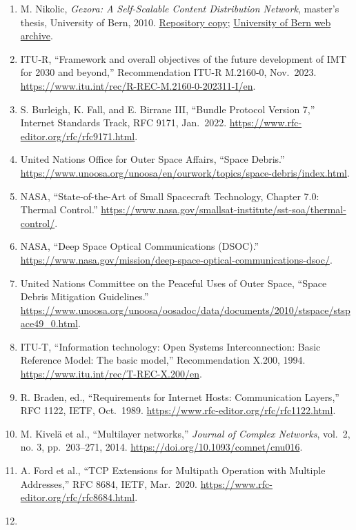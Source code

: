 \documentclass[
  american,
  11pt,
]{article}
\providecommand{\tightlist}{%
  \setlength{\itemsep}{0pt}\setlength{\parskip}{0pt}}
\begin{document}
\begin{enumerate}
\def\labelenumi{\arabic{enumi}.}
\tightlist
\item
  M. Nikolic, \emph{Gezora: A Self-Scalable Content Distribution
  Network}, master's thesis, University of Bern, 2010.
  \href{../Ni10.pdf}{Repository copy};
  \href{https://webarchive.inf.unibe.ch/cds/publications/files/Ni10.pdf}{University
  of Bern web archive}.
\item
  ITU-R, ``Framework and overall objectives of the future development of
  IMT for 2030 and beyond,'' Recommendation ITU-R M.2160-0, Nov.~2023.
  \url{https://www.itu.int/rec/R-REC-M.2160-0-202311-I/en}.
\item
  S. Burleigh, K. Fall, and E. Birrane III, ``Bundle Protocol Version
  7,'' Internet Standards Track, RFC 9171, Jan.~2022.
  \url{https://www.rfc-editor.org/rfc/rfc9171.html}.
\item
  United Nations Office for Outer Space Affairs, ``Space Debris.''
  \url{https://www.unoosa.org/unoosa/en/ourwork/topics/space-debris/index.html}.
\item
  NASA, ``State-of-the-Art of Small Spacecraft Technology, Chapter 7.0:
  Thermal Control.''
  \url{https://www.nasa.gov/smallsat-institute/sst-soa/thermal-control/}.
\item
  NASA, ``Deep Space Optical Communications (DSOC).''
  \url{https://www.nasa.gov/mission/deep-space-optical-communications-dsoc/}.
\item
  United Nations Committee on the Peaceful Uses of Outer Space, ``Space
  Debris Mitigation Guidelines.''
  \url{https://www.unoosa.org/unoosa/oosadoc/data/documents/2010/stspace/stspace49_0.html}.
\item
  ITU-T, ``Information technology: Open Systems Interconnection: Basic
  Reference Model: The basic model,'' Recommendation X.200, 1994.
  \url{https://www.itu.int/rec/T-REC-X.200/en}.
\item
  R. Braden, ed., ``Requirements for Internet Hosts: Communication
  Layers,'' RFC 1122, IETF, Oct.~1989.
  \url{https://www.rfc-editor.org/rfc/rfc1122.html}.
\item
  M. Kivelä et al., ``Multilayer networks,'' \emph{Journal of Complex
  Networks}, vol.~2, no. 3, pp.~203--271, 2014.
  \url{https://doi.org/10.1093/comnet/cnu016}.
\item
  A. Ford et al., ``TCP Extensions for Multipath Operation with Multiple
  Addresses,'' RFC 8684, IETF, Mar.~2020.
  \url{https://www.rfc-editor.org/rfc/rfc8684.html}.
\item

\end{enumerate}
\end{document}
